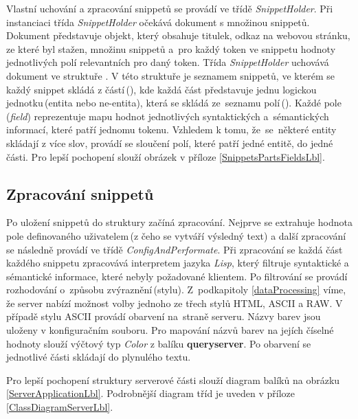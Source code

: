 Vlastní uchování a zpracování snippetů se provádí ve třídě \emph{SnippetHolder}. Při instanciaci třída \emph{SnippetHolder} očekává dokument s množinou snippetů. Dokument představuje objekt, který obsahuje titulek, odkaz na webovou stránku, ze které byl stažen, množinu snippetů a~pro každý token ve snippetu hodnoty jednotlivých polí relevantních pro daný token. Třída \emph{SnippetHolder} uchovává dokument ve struktuře  \emph{}. V této struktuře je \emph{}  seznamem snippetů, ve kterém se každý snippet skládá z částí\,(\emph{}), kde každá část představuje jednu logickou jednotku\,(entita nebo ne-entita), která se skládá ze~seznamu polí\,(\emph{}). Každé pole\,(\emph{field}) reprezentuje mapu hodnot jednotlivých syntaktických a~sémantických informací, které patří jednomu tokenu. Vzhledem k tomu, že~se~některé entity skládají z více slov, provádí se sloučení polí, které patří jedné entitě, do jedné části. Pro lepší pochopení slouží obrázek v příloze \ref{SnippetsPartsFieldsLbl}. 



\subsection*{Zpracování snippetů}
\label{SnippetsProcessingLbl}
Po uložení snippetů do struktury \emph{} začíná zpracování. Nejprve se extrahuje hodnota pole definovaného uživatelem\,(z čeho se vytváří výsledný text) a další zpracování se následně provádí ve třídě \emph{ConfigAndPerformate}. Při zpracování se každá část každého snippetu zpracovává interpretem jazyka \emph{Lisp}, který filtruje syntaktické a sémantické  informace, které nebyly požadované klientem. Po filtrování se provádí rozhodování o~způsobu zvýraznění\,(stylu). Z~podkapitoly \ref{dataProcessing} víme, že server nabízí možnost volby jednoho ze třech stylů HTML, ASCII a RAW.  V případě stylu ASCII provádí obarvení na~straně serveru. Názvy barev jsou uloženy v konfiguračním souboru. Pro mapování názvů barev na jejích číselné hodnoty slouží výčtový typ \emph{Color} z balíku \textbf{queryserver}.  Po obarvení se jednotlivé části skládají do plynulého textu.

Pro lepší pochopení struktury serverové části slouží diagram balíků na obrázku \ref{ServerApplicationLbl}. Podrobnější diagram tříd je uveden v příloze \ref{ClassDiagramServerLbl}. 

